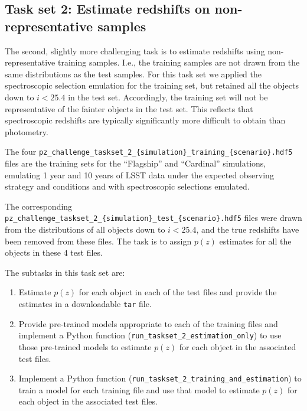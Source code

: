 \subsection{Task set 2: Estimate redshifts on non-representative
  samples}

The second, slightly more challenging task is to estimate redshifts
using non-representative training samples. I.e., the training samples
are not drawn from the same distributions as the test samples. For this task set we
applied the spectroscopic selection emulation for the training set, but
retained all the objects down to $i < 25.4$ in the test set.
Accordingly, the training set will not be representative of the
fainter objects in the test set. This reflects that spectroscopic redshifts
are typically significantly more difficult to obtain than photometry.

The four 
\texttt{pz\_challenge\_taskset\_2\_\{simulation\}\_training\_\{scenario\}.hdf5}
files are the training sets for the ``Flagship'' and ``Cardinal''
simulations, emulating 1 year and 10 years of LSST data under the
expected observing strategy and conditions and with spectroscopic
selections emulated.

The corresponding 
\texttt{pz\_challenge\_taskset\_2\_\{simulation\}\_test\_\{scenario\}.hdf5}
files were \allowbreak  drawn from the distributions of all objects down to $i <
25.4$, and the true redshifts have been removed from these files. 
The task is to assign $p(z)$ estimates for all the objects in these 4 test files.

The subtasks in this task set are:

\begin{enumerate}
  \item{Estimate $p(z)$ for each object in each of the test files and
      provide the estimates in a downloadable \texttt{tar} file.}
  \item{Provide pre-trained models appropriate to each of the training
      files and implement a Python function
      (\texttt{run\_taskset\_2\_estimation\_only}) to use those
      pre-trained models to estimate $p(z)$ for each object in the
      associated test files.}    
  \item{Implement a Python function
      (\texttt{run\_taskset\_2\_training\_and\_estimation}) to train a model for
      each training file and use that model to estimate $p(z)$ for
      each object in the associated test files.}    
\end{enumerate}
  
